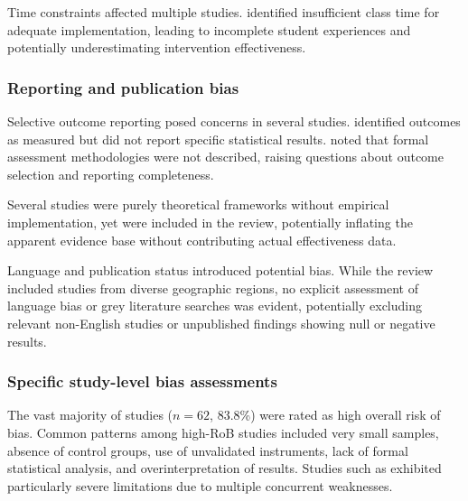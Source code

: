 \documentclass[a4paper,fleqn]{cas-sc}
\begin{document}
Time constraints affected multiple studies. \citet{14Forsyth2023, 42Huffer201581, 50Lye2013, 62Milosz201896, 79Fernes2024379} identified insufficient class time for adequate implementation, leading to incomplete student experiences and potentially underestimating intervention effectiveness.

\subsubsection{Reporting and publication bias}

Selective outcome reporting posed concerns in several studies. \citet{16Chen201447} identified outcomes as measured but did not report specific statistical results. \citet{30Zin2008, 36Scholz2021, 39Tegos2014838} noted that formal assessment methodologies were not described, raising questions about outcome selection and reporting completeness.

Several studies \citep{17Manzanares2019, 18Shih201054, 20Erandaru2014, 23Zin2009322} were purely theoretical frameworks without empirical implementation, yet were included in the review, potentially inflating the apparent evidence base without contributing actual effectiveness data.

Language and publication status introduced potential bias. While the review included studies from diverse geographic regions, no explicit assessment of language bias or grey literature searches was evident, potentially excluding relevant non-English studies or unpublished findings showing null or negative results.

\subsubsection{Specific study-level bias assessments}

The vast majority of studies ($n=62$, 83.8\%) were rated as high overall risk of bias. Common patterns among high-RoB studies included very small samples, absence of control groups, use of unvalidated instruments, lack of formal statistical analysis, and overinterpretation of results. Studies such as \citet{13Humpire2022, 17Manzanares2019, 18Shih201054, 20Erandaru2014, 22Nugroho2020149, 23Zin2009322, 25Repantis2011502, 50Lye2013, 51Ardito2007} exhibited particularly severe limitations due to multiple concurrent weaknesses.

\end{document}
